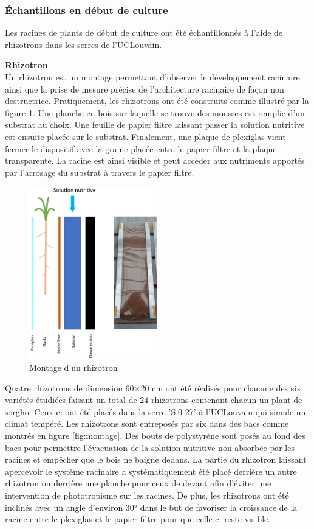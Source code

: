 \subsubsection{Échantillons en début de culture}
Les racines de plants de début de culture ont été échantillonnés à l'aide de rhizotrons dans les serres de l'UCLouvain.
\newline

\textbf{Rhizotron} \\
Un rhizotron est un montage permettant d'observer le développement racinaire ainsi que la prise de mesure précise de l'architecture racinaire de façon non destructrice.
Pratiquement, les rhizotrons ont été construits comme illustré par la figure \ref{fig:rhizotron}.
Une planche en bois sur laquelle se trouve des mousses est remplie d'un substrat au choix.
Une feuille de papier filtre laissant passer la solution nutritive est ensuite placée sur le substrat.
Finalement, une plaque de plexiglas vient fermer le dispositif avec la graine placée entre le papier filtre et la plaque transparente.
La racine est ainsi visible et peut accéder aux nutriments apportés par l'arrosage du substrat à travers le papier filtre.
\newpage

\begin{figure}[ht]
\centering
\includegraphics[width=0.5\textwidth]{Image/rhizotron.png}
\caption{Montage d'un rhizotron}
\label{fig:rhizotron}
\end{figure}

Quatre rhizotrons de dimension 60×20 cm ont été réalisés pour chacune des six variétés étudiées faisant un total de 24 rhizotrons contenant chacun un plant de sorgho.
Ceux-ci ont été placés dans la serre 'S.0 27' à l'UCLouvain qui simule un climat tempéré.
Les rhizotrons sont entreposés par six dans des bacs comme montrés en figure \ref{fig:montage}.
Des bouts de polystyrène sont posés au fond des bacs pour permettre l'évacuation de la solution nutritive non absorbée par les racines et empêcher que le bois ne baigne dedans.
La partie du rhizotron laissant apercevoir le système racinaire a systématiquement été placé derrière un autre rhizotron ou derrière une planche pour ceux de devant afin d'éviter une intervention de phototropisme sur les racines.
De plus, les rhizotrons ont été inclinés avec un angle d'environ 30° dans le but de favoriser la croissance de la racine entre le plexiglas et le papier filtre pour que celle-ci reste visible.
\newpage

